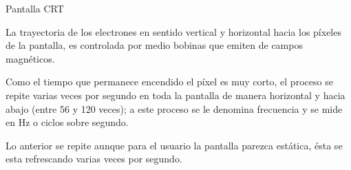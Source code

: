 \begin{frame}
\begin{block}{Pantalla \ac{CRT}}
\begin{itemize}
{        \item           La trayectoria de los electrones en sentido vertical y
          horizontal hacia los p\'ixeles de la pantalla, es controlada
          por medio bobinas que emiten de campos magn\'eticos.

        \item           Como el tiempo que permanece encendido el p\'ixel es muy
          corto, el proceso se repite varias veces por segundo en toda
          la pantalla de manera horizontal y hacia abajo (entre 56 y
          120 veces); a este proceso se le denomina frecuencia y se
          mide en Hz o ciclos sobre segundo.

        \item           Lo anterior se repite aunque para el usuario la pantalla
          parezca est\'atica, \'esta se esta refrescando varias veces por
          segundo.
}
    \end{itemize}

  \end{block}
\end{frame}


